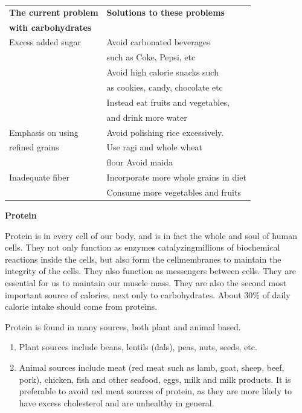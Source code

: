 \begin{center}
\begin{tabular}{|l|l|}
\hline
\textbf{The current problem} & \textbf{Solutions to these problems}\\
\textbf{with carbohydrates} &\\
\hline
Excess added sugar & Avoid carbonated beverages\\
 & such as Coke, Pepsi, etc\\
 & Avoid high calorie snacks such\\
 & as cookies, candy, chocolate etc\\
 & Instead eat fruits and vegetables,\\
 & and drink more water\\
\hline
Emphasis on using & Avoid polishing rice excessively.\\
refined grains & Use ragi and whole wheat\\
 & flour Avoid maida\\
\hline
Inadequate fiber & Incorporate more whole grains in diet\\
 & Consume more vegetables and fruits\\
\hline
\end{tabular}
\end{center}

\noindent\textbf{Protein}

Protein is in every cell of our body, and is in fact the whole and soul of human cells. They not only function as enzymes catalyzing\break millions of biochemical reactions inside the cells, but also form the cell\break membranes to maintain the integrity of the cells. They also function as messengers between cells. They are essential for us to maintain our muscle mass. They are also the second most important source of calories, next only to carbohydrates. About 30\% of daily calorie intake should come from proteins.

\noindent Protein is found in many sources, both plant and animal based.

\begin{enumerate}[\ding{118}]
\itemsep=0pt
\item Plant sources include beans, lentils (dals), peas, nuts, seeds, etc.
\item Animal sources include meat (red meat such as lamb, goat, sheep, beef, pork), chicken, fish and other seafood, eggs, milk and milk products. It is preferable to avoid red meat sources of protein, as they are more likely to have excess cholesterol and are unhealthy in general.
\end{enumerate}

